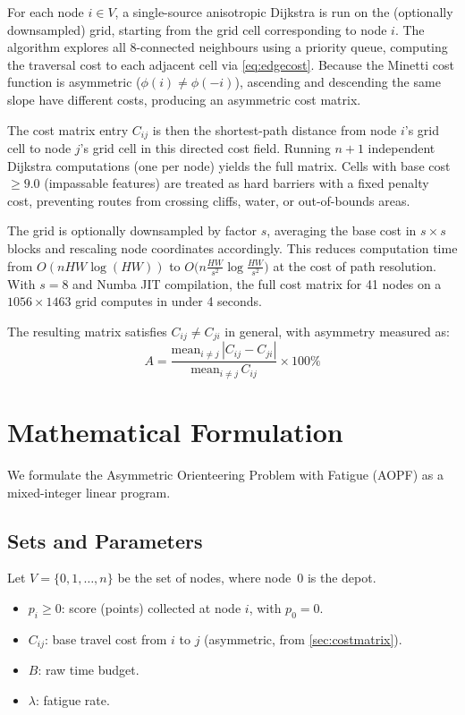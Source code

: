 \documentclass[11pt,a4paper]{article}
\begin{document}
For each node $i \in V$, a single-source anisotropic Dijkstra is run on the (optionally downsampled) grid, starting from the grid cell corresponding to node $i$.
The algorithm explores all 8-connected neighbours using a priority queue, computing the traversal cost to each adjacent cell via \cref{eq:edgecost}.
Because the Minetti cost function is asymmetric ($\phi(i) \neq \phi(-i)$), ascending and descending the same slope have different costs, producing an asymmetric cost matrix.

The cost matrix entry $C_{ij}$ is then the shortest-path distance from node $i$'s grid cell to node $j$'s grid cell in this directed cost field.
Running $n+1$ independent Dijkstra computations (one per node) yields the full matrix.
Cells with base cost $\geq 9.0$ (impassable features) are treated as hard barriers with a fixed penalty cost, preventing routes from crossing cliffs, water, or out-of-bounds areas.

The grid is optionally downsampled by factor $s$, averaging the base cost in $s \times s$ blocks and rescaling node coordinates accordingly.
This reduces computation time from $O(nHW \log(HW))$ to $O\bigl(n \frac{HW}{s^2} \log \frac{HW}{s^2}\bigr)$ at the cost of path resolution.
With $s = 8$ and Numba JIT compilation, the full cost matrix for 41 nodes on a $1056 \times 1463$ grid computes in under 4 seconds.

The resulting matrix satisfies $C_{ij} \neq C_{ji}$ in general, with asymmetry measured as:
\begin{equation}
  A = \frac{\text{mean}_{i \neq j}\, |C_{ij} - C_{ji}|}{\text{mean}_{i \neq j}\, C_{ij}} \times 100\%
  \label{eq:asymmetry}
\end{equation}


\section{Mathematical Formulation}
\label{sec:formulation}

We formulate the Asymmetric Orienteering Problem with Fatigue (AOPF) as a mixed-integer linear program.

\subsection{Sets and Parameters}

Let $V = \{0, 1, \ldots, n\}$ be the set of nodes, where node~0 is the depot.
\begin{itemize}[nosep]
  \item $p_i \geq 0$: score (points) collected at node $i$, with $p_0 = 0$.
  \item $C_{ij}$: base travel cost from $i$ to $j$ (asymmetric, from \cref{sec:costmatrix}).
  \item $B$: raw time budget.
  \item $\lambda$: fatigue rate.
\end{itemize}
\end{document}
